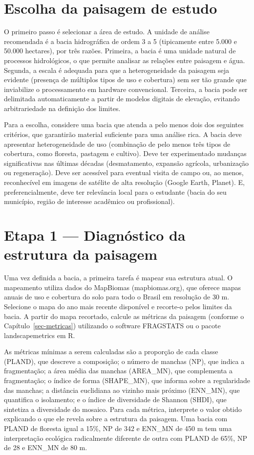 \documentclass[
  portuguese,
  11pt,
  a4paper,
  open=any]{scrbook}
\begin{document}
\section{Escolha da paisagem de
estudo}\label{escolha-da-paisagem-de-estudo}

O primeiro passo é selecionar a área de estudo. A unidade de análise
recomendada é a bacia hidrográfica de ordem 3 a 5 (tipicamente entre
5.000 e 50.000 hectares), por três razões. Primeira, a bacia é uma
unidade natural de processos hidrológicos, o que permite analisar as
relações entre paisagem e água. Segunda, a escala é adequada para que a
heterogeneidade da paisagem seja evidente (presença de múltiplos tipos
de uso e cobertura) sem ser tão grande que inviabilize o processamento
em hardware convencional. Terceira, a bacia pode ser delimitada
automaticamente a partir de modelos digitais de elevação, evitando
arbitrariedade na definição dos limites.

Para a escolha, considere uma bacia que atenda a pelo menos dois dos
seguintes critérios, que garantirão material suficiente para uma análise
rica. A bacia deve apresentar heterogeneidade de uso (combinação de pelo
menos três tipos de cobertura, como floresta, pastagem e cultivo). Deve
ter experimentado mudanças significativas nas últimas décadas
(desmatamento, expansão agrícola, urbanização ou regeneração). Deve ser
acessível para eventual visita de campo ou, ao menos, reconhecível em
imagens de satélite de alta resolução (Google Earth, Planet). E,
preferencialmente, deve ter relevância local para o estudante (bacia do
seu município, região de interesse acadêmico ou profissional).

\section{Etapa 1 --- Diagnóstico da estrutura da
paisagem}\label{etapa-1-diagnuxf3stico-da-estrutura-da-paisagem}

Uma vez definida a bacia, a primeira tarefa é mapear sua estrutura
atual. O mapeamento utiliza dados do MapBiomas (mapbiomas.org), que
oferece mapas anuais de uso e cobertura do solo para todo o Brasil em
resolução de 30 m. Selecione o mapa do ano mais recente disponível e
recorte-o pelos limites da bacia. A partir do mapa recortado, calcule as
métricas da paisagem (conforme o Capítulo~\ref{sec-metricas}) utilizando
o software FRAGSTATS ou o pacote landscapemetrics em R.

As métricas mínimas a serem calculadas são a proporção de cada classe
(PLAND), que descreve a composição; o número de manchas (NP), que indica
a fragmentação; a área média das manchas (AREA\_MN), que complementa a
fragmentação; o índice de forma (SHAPE\_MN), que informa sobre a
regularidade das manchas; a distância euclidiana ao vizinho mais próximo
(ENN\_MN), que quantifica o isolamento; e o índice de diversidade de
Shannon (SHDI), que sintetiza a diversidade do mosaico. Para cada
métrica, interprete o valor obtido explicando o que ele revela sobre a
estrutura da paisagem. Uma bacia com PLAND de floresta igual a 15\%, NP
de 342 e ENN\_MN de 450 m tem uma interpretação ecológica radicalmente
diferente de outra com PLAND de 65\%, NP de 28 e ENN\_MN de 80 m.
\end{document}
